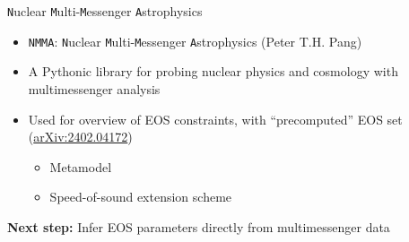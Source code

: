 \documentclass[usenames,dvipsnames,t]{beamer}
\begin{document}




\begin{frame}{\texttt{N}uclear \texttt{M}ulti-\texttt{M}essenger \texttt{A}strophysics}

  \def\x{7mm}
  \def\y{3mm}
  
  \begin{itemize}
    \item \texttt{NMMA}: \texttt{N}uclear \texttt{M}ulti-\texttt{M}essenger \texttt{A}strophysics (Peter T.H. Pang) 
    
    \vspace{\x}

    \item A Pythonic library for probing nuclear physics and cosmology with multimessenger analysis
    
    \vspace{\x}

    \item Used for overview of EOS constraints, with ``precomputed'' EOS set (\href{https://arxiv.org/abs/2402.04172}{arXiv:2402.04172})
    \begin{itemize}
      \item Metamodel
      \item Speed-of-sound extension scheme
    \end{itemize}
  \end{itemize}

  \vspace{\x}

  \begin{tcolorbox}[colback=blue!10, boxrule=0pt]
    \textbf{Next step:} Infer EOS parameters directly from multimessenger data
  \end{tcolorbox}
  
  \end{frame}
\end{document}
